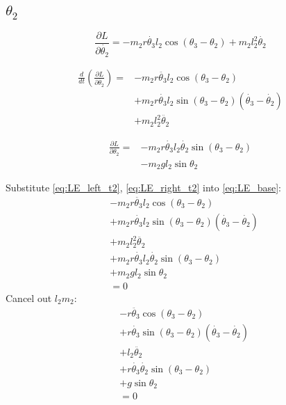 \documentclass[titlepage]{article}
\numberwithin{equation}{section}
\begin{document}
\subsection{$\theta_2$}
\begin{equation}
\frac{\partial L}{\partial \dot{\theta_2}} = - m_2 r \dot{\theta_3} l_2 \cos{(\theta_3 - \theta_2)} + m_2 l_2^2 \dot{\theta_2}
\end{equation}

\begin{align}
\frac{d}{dt} \left(\frac{\partial L}{\partial \dot{\theta_2}}\right) = &- m_2 r \ddot{\theta_3} l_2 \cos{(\theta_3 - \theta_2)} \nonumber \\
 &+ m_2 r \dot{\theta_3} l_2 \sin{(\theta_3 - \theta_2)} (\dot{\theta_3} - \dot{\theta_2}) \nonumber \\
 &+ m_2 l_2^2 \ddot{\theta_2} \label{eq:LE_left_t2}
\end{align}

\begin{align}
\frac{\partial L}{\partial \theta_2} = &- m_2 r \dot{\theta_3} l_2 \dot{\theta_2} \sin{(\theta_3 - \theta_2)} \nonumber \\
 &- m_2 g l_2 \sin \theta_2 \label{eq:LE_right_t2}
\end{align}

\bigskip
\noindent
Substitute \ref{eq:LE_left_t2}, \ref{eq:LE_right_t2} into \ref{eq:LE_base}:
\begin{align}
 &- m_2 r \ddot{\theta_3} l_2 \cos{(\theta_3 - \theta_2)} \nonumber \\
 &+ m_2 r \dot{\theta_3} l_2 \sin{(\theta_3 - \theta_2)} (\dot{\theta_3} - \dot{\theta_2}) \nonumber \\
 &+ m_2 l_2^2 \ddot{\theta_2} \nonumber \\
 &+ m_2 r \dot{\theta_3} l_2 \dot{\theta_2} \sin{(\theta_3 - \theta_2)} \nonumber \\
 &+ m_2 g l_2 \sin \theta_2 \nonumber \\
 &= 0
\end{align}
Cancel out $l_2 m_2$:
\begin{align}
 &- r \ddot{\theta_3} \cos{(\theta_3 - \theta_2)} \nonumber \\
 &+ r \dot{\theta_3} \sin{(\theta_3 - \theta_2)} (\dot{\theta_3} - \dot{\theta_2}) \nonumber \\
 &+ l_2 \ddot{\theta_2} \nonumber \\
 &+ r \dot{\theta_3} \dot{\theta_2} \sin{(\theta_3 - \theta_2)} \nonumber \\
 &+ g \sin \theta_2 \nonumber \\
 &= 0
\end{align}
\end{document}
